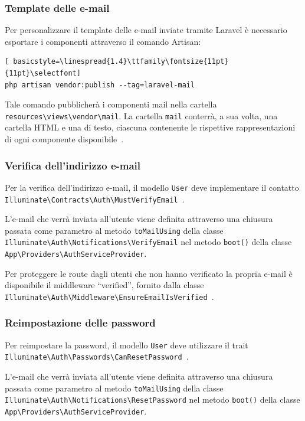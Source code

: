\subsubsection{Template delle e-mail}
Per personalizzare il template delle e-mail inviate tramite Laravel \`e necessario esportare i componenti attraverso il comando Artisan:
\begin{lstlisting}[	basicstyle=\linespread{1.4}\ttfamily\fontsize{11pt}{11pt}\selectfont]
php artisan vendor:publish --tag=laravel-mail
\end{lstlisting}
Tale comando pubblicher\`a i componenti mail nella cartella \verb|resources\views\vendor\mail|. La cartella \verb|mail| conterr\`a, a sua volta, una cartella HTML e una di testo, ciascuna contenente le rispettive rappresentazioni di ogni componente disponibile~\cite{LaravelEmailConfig}.

\subsubsection{Verifica dell'indirizzo e-mail}
Per la verifica dell'indirizzo e-mail, il modello \verb|User| deve implementare il contatto \verb|Illuminate\Contracts\Auth\MustVerifyEmail|~\cite{LaravelEmailVerification}.

L'e-mail che verr\`a inviata all'utente viene definita attraverso una chiusura passata come parametro al metodo \verb|toMailUsing| della classe \verb|Illuminate\Auth\Notifications\VerifyEmail| nel metodo \verb|boot()| della classe \verb|App\Providers\AuthServiceProvider|.

Per proteggere le route dagli utenti che non hanno verificato la propria e-mail \`e disponibile il middleware ``verified'', fornito dalla classe \verb|Illuminate\Auth\Middleware\EnsureEmailIsVerified|~\cite{LaravelEmailVerification}.

\subsubsection{Reimpostazione delle password}
Per reimpostare la password, il modello \verb|User| deve utilizzare il trait \verb|Illuminate\Auth\Passwords\CanResetPassword|~\cite{LaravelResetPassword}.

L'e-mail che verr\`a inviata all'utente viene definita attraverso una chiusura passata come parametro al metodo \verb|toMailUsing| della classe \verb|Illuminate\Auth\Notifications\ResetPassword| nel metodo \verb|boot()| della classe \verb|App\Providers\AuthServiceProvider|.

